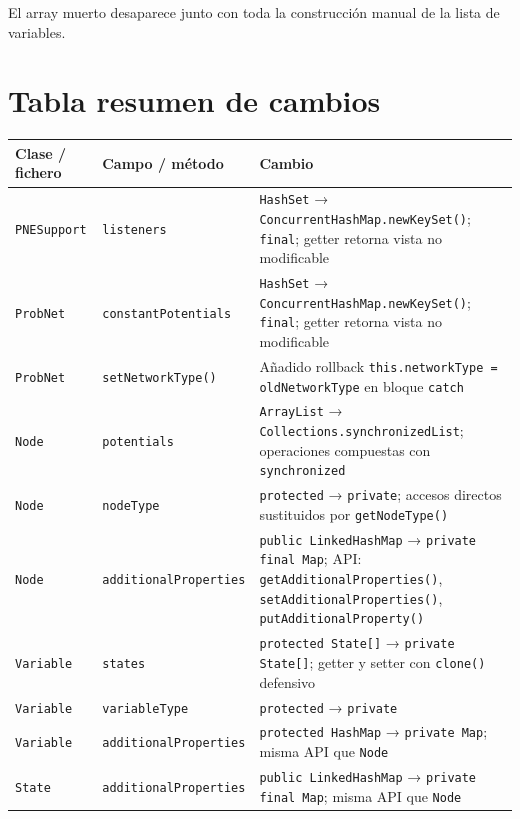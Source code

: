 \documentclass[11pt,a4paper]{article}
\newcommand{\code}[1]{\texttt{#1}}
\begin{document}
El array muerto desaparece junto con toda la construcción manual de la
lista de variables.

\section{Tabla resumen de cambios}

\begin{table}[!htbp]
\centering
\begin{tabular}{p{4.5cm} p{3.5cm} p{6cm}}
\toprule
\textbf{Clase / fichero} & \textbf{Campo / método} & \textbf{Cambio} \\
\midrule
\code{PNESupport}
  & \code{listeners}
  & \code{HashSet} → \code{ConcurrentHashMap.newKeySet()}; \code{final}; getter retorna vista no modificable \\
\addlinespace
\code{ProbNet}
  & \code{constantPotentials}
  & \code{HashSet} → \code{ConcurrentHashMap.newKeySet()}; \code{final}; getter retorna vista no modificable \\
\addlinespace
\code{ProbNet}
  & \code{setNetworkType()}
  & Añadido rollback \code{this.networkType = oldNetworkType} en bloque \code{catch} \\
\addlinespace
\code{Node}
  & \code{potentials}
  & \code{ArrayList} → \code{Collections.synchronizedList}; operaciones compuestas con \code{synchronized} \\
\addlinespace
\code{Node}
  & \code{nodeType}
  & \code{protected} → \code{private}; accesos directos sustituidos por \code{getNodeType()} \\
\addlinespace
\code{Node}
  & \code{additionalProperties}
  & \code{public LinkedHashMap} → \code{private final Map}; API: \code{getAdditionalProperties()}, \code{setAdditionalProperties()}, \code{putAdditionalProperty()} \\
\addlinespace
\code{Variable}
  & \code{states}
  & \code{protected State[]} → \code{private State[]}; getter y setter con \code{clone()} defensivo \\
\addlinespace
\code{Variable}
  & \code{variableType}
  & \code{protected} → \code{private} \\
\addlinespace
\code{Variable}
  & \code{additionalProperties}
  & \code{protected HashMap} → \code{private Map}; misma API que \code{Node} \\
\addlinespace
\code{State}
  & \code{additionalProperties}
  & \code{public LinkedHashMap} → \code{private final Map}; misma API que \code{Node} \\

\end{tabular}
\end{table}
\end{document}
